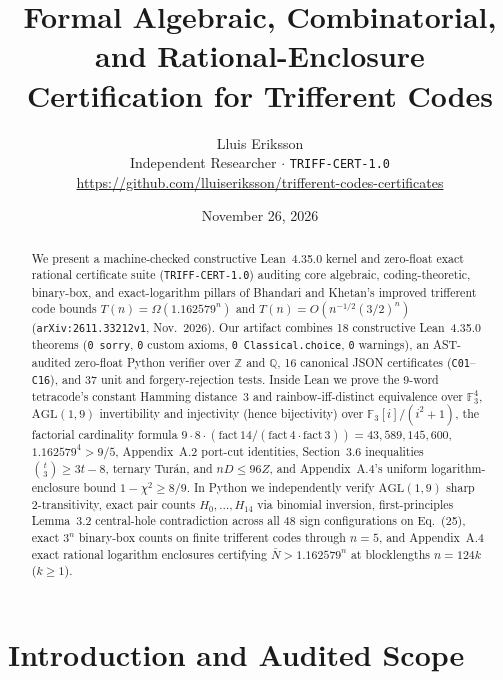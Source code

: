 \documentclass[10pt,twocolumn]{article}
\title{\textbf{Formal Algebraic, Combinatorial, and Rational-Enclosure Certification for Trifferent Codes}}
\author{Lluis Eriksson\\
\small Independent Researcher \quad $\cdot$ \quad \texttt{TRIFF-CERT-1.0}\\
\small \url{https://github.com/lluiseriksson/trifferent-codes-certificates}}
\date{November 26, 2026}
\begin{document}
\maketitle

\begin{abstract}
We present a machine-checked constructive Lean~4.35.0 kernel and zero-float exact rational certificate suite (\texttt{TRIFF-CERT-1.0}) auditing core algebraic, coding-theoretic, binary-box, and exact-logarithm pillars of Bhandari and Khetan's improved trifferent code bounds $T(n) = \Omega(1.162579^n)$ and $T(n) = O(n^{-1/2}(3/2)^n)$ (\texttt{arXiv:2611.33212v1}, Nov.\ 2026). Our artifact combines 18 constructive Lean~4.35.0 theorems (\texttt{0 sorry}, \texttt{0} custom axioms, \texttt{0 Classical.choice}, \texttt{0} warnings), an AST-audited zero-float Python verifier over $\mathbb{Z}$ and $\mathbb{Q}$, 16 canonical JSON certificates (\texttt{C01}--\texttt{C16}), and 37 unit and forgery-rejection tests. Inside Lean we prove the 9-word tetracode's constant Hamming distance~3 and rainbow-iff-distinct equivalence over $\mathbb{F}_3^4$, $\mathrm{AGL}(1,9)$ invertibility and injectivity (hence bijectivity) over $\mathbb{F}_3[i]/(i^2+1)$, the factorial cardinality formula $9\cdot 8\cdot (\mathrm{fact}\,14/(\mathrm{fact}\,4\cdot \mathrm{fact}\,3)) = 43{,}589{,}145{,}600$, $1.162579^4 > 9/5$, Appendix~A.2 port-cut identities, Section~3.6 inequalities $\binom{t}{3} \ge 3t-8$, ternary Tur\'{a}n, and $nD \le 96Z$, and Appendix~A.4's uniform logarithm-enclosure bound $1 - \chi^2 \ge 8/9$. In Python we independently verify $\mathrm{AGL}(1,9)$ sharp 2-transitivity, exact pair counts $H_0,\dots,H_{14}$ via binomial inversion, first-principles Lemma~3.2 central-hole contradiction across all 48 sign configurations on Eq.~(25), exact $3^n$ binary-box counts on finite trifferent codes through $n=5$, and Appendix~A.4 exact rational logarithm enclosures certifying $\bar{N} > 1.162579^n$ at blocklengths $n = 124k$ ($k \ge 1$).
\end{abstract}

\section{Introduction and Audited Scope}
\end{document}
